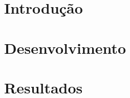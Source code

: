 \documentclass[
	12pt,				%
	openright,			%
	twoside,			%
	a4paper,			%
	english,			%
	french,				%
	spanish,			%
	brazil				%
	]{abntex2}
\begin{document}
\part{Introdução}




\part{Desenvolvimento}






\part{Resultados}








\postextual



%
%


\printindex
\end{document}

